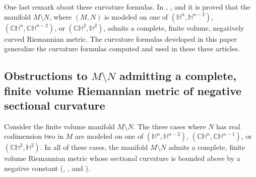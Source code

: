 \documentclass[10pt]{amsart}
\def\R{\mathbb{R}}
\def\S{\mathcal{S}}
\def\H{\mathbb{H}}
\def\C{\mathbb{C}}
\def\S{\mathbb{S}}
\theoremstyle{definition}
\theoremstyle{remark}
\numberwithin{equation}{section}
\begin{document}

One last remark about these curvature formulas.  
In \cite{Belegradek real}, \cite{Belegradek complex}, and \cite{Min} it is proved that the manifold $M \setminus N$, where $(M, N)$ is modeled on one of $(\H^n, \H^{n-2})$, $(\C \H^n, \C \H^{n-2})$, or $(\C \H^2, \H^2)$, admits a complete, finite volume, negatively curved Riemannian metric.  
The curvature formulas developed in this paper generalize the curvature formulas computed and used in these three articles.




\subsection{Obstructions to $M \setminus N$ admitting a complete, finite volume Riemannian metric of negative sectional curvature} 
Consider the finite volume manifold $M \setminus N$.
The three cases where $N$ has real codimension two in $M$ are modeled on one of $(\H^n, \H^{n-2})$, $(\C \H^n, \C \H^{n-1})$, or $(\C \H^2, \H^2)$.  
In all of these cases, the manifold $M \setminus N$ admits a complete, finite volume Riemannian metric whose sectional curvature is bounded above by a negative constant (\cite{Belegradek real}, \cite{Belegradek complex}, and \cite{Min}).  
\end{document}
